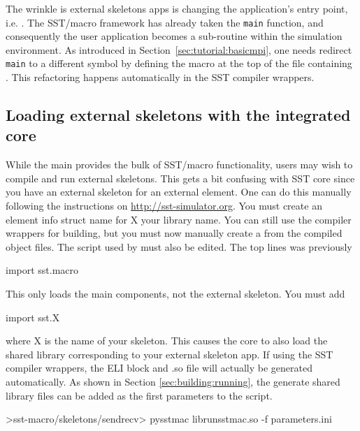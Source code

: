 The wrinkle is external skeletons apps is changing the application's entry point, i.e. .
The SST/macro framework has already taken the \texttt{main} function, and consequently the user application becomes a sub-routine within the simulation environment. As introduced in Section~\ref{sec:tutorial:basicmpi}, one needs redirect \texttt{main} to a different symbol by defining the macro  at the top of the file containing . This refactoring happens automatically in the SST compiler wrappers. 


\subsection{Loading external skeletons with the integrated core}\label{subsec:linkageCore}
While the main  provides the bulk of SST/macro functionality, 
users may wish to compile and run external skeletons.  This gets a bit confusing with SST core since you have an external skeleton for an external element.  One can do this manually following the instructions on \url{http://sst-simulator.org}. You must create an element info struct name  for X your library name.  You can still use the  compiler wrappers for building, but you must now manually create a  from the compiled object files.  The  script used by  must also be edited.  The top lines was previously

\begin{ViFile}
import sst.macro
\end{ViFile}
This only loads the main components, not the external skeleton. You must add

\begin{ViFile}
import sst.X
\end{ViFile}
where X is the name of your skeleton. This causes the core to also load the shared library corresponding to your external skeleton app.
If using the SST compiler wrappers, the ELI block and .so file will actually be generated automatically.  As shown in Section \ref{sec:building:running},
the generate shared library files can be added as the first parameters to the  script.

\begin{ShellCmd}
>sst-macro/skeletons/sendrecv> pysstmac librunsstmac.so -f parameters.ini
\end{ShellCmd} 


